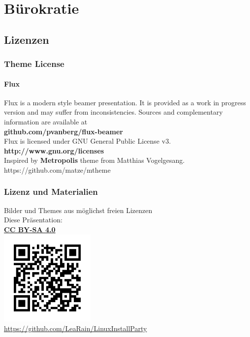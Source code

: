 \documentclass[9pt]{beamer}
\begin{document}
\section{Bürokratie}

\subsection{Lizenzen}

\begin{frame}
 \centering
 \frametitle{Theme License}
 \framesubtitle{Flux}
 	\justifying
 Flux is a modern style beamer presentation. It is provided as a work in progress version and may suffer from inconsistencies. Sources and complementary information are available at\\[0.3cm]
 	\centering\textbf{github.com/pvanberg/flux-beamer}\\
 Flux is licensed under GNU General Public License v3.\\[0.3cm]
 	\centering\textbf{http://www.gnu.org/licenses}\\[0.3cm]
Inspired by \textbf{Metropolis} theme from Matthias Vogelgesang.\\
https://github.com/matze/mtheme 
 
\end{frame}

\begin{frame}
 \centering
 \frametitle{Lizenz und Materialien}
 \justifying
 \centering
 Bilder und Themes aus möglichst freien Lizenzen\\
 Diese Präsentation:\\
 \centering
 \textbf{\href{https://creativecommons.org/licenses/by-sa/4.0/}{CC BY-SA 4.0}}\\
 \includegraphics[width=0.35\textwidth]{assets/qr.png}\\
 \href{https://github.com/LeaRain/LinuxInstallParty}{https://github.com/LeaRain/LinuxInstallParty}
\end{frame}
\end{document}
